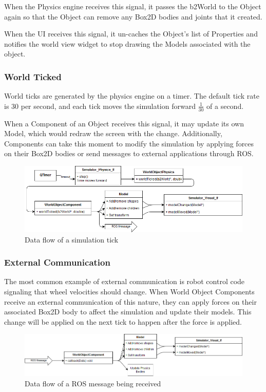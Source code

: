  When the Physics engine receives this signal, it passes the b2World to the Object again so that the Object can remove any Box2D bodies and joints that it created.
 
 When the UI receives this signal, it un-caches the Object's list of Properties and notifies the world view widget to stop drawing the Models associated with the object.
 
 \subsubsection*{World Ticked}
 World ticks are generated by the physics engine on a timer. The default tick rate is 30 per second, and each tick moves the simulation forward $\frac{1}{30}$ of a second.
 
 When a Component of an Object receives this signal, it may update its own Model, which would redraw the screen with the change. Additionally, Components can take this moment to modify the simulation by applying forces on their Box2D bodies or send messages to external applications through ROS.
 
  	\begin{figure}[h]
 		\centering
 		\includegraphics[width=\textwidth]{./images_design/uml/event_tick}
 		\caption{Data flow of a simulation tick\label{uml:tickevent}}
 	\end{figure}
 
 \subsubsection*{External Communication}
 The most common example of external communication is robot control code signaling that wheel velocities should change. When World Object Components receive an external communication of this nature, they can apply forces on their associated Box2D body to affect the simulation and update their models. This change will be applied on the next tick to happen after the force is applied.
 
  	\begin{figure}[h]
 		\centering
 		\includegraphics[width=\textwidth]{./images_design/uml/event_data}
 		\caption{Data flow of a ROS message being received\label{uml:dataevent}}
 	\end{figure}
 
